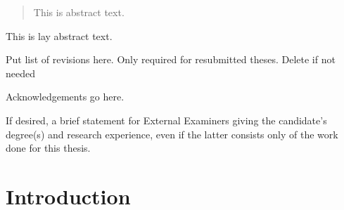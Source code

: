 \begin{abstract} %
  This is abstract text. 
  
  \lipsum[1-2]
\end{abstract}%
\clearpage



\begin{uomlay} %
  This is lay abstract text. 
  
  \lipsum[1-2]
\end{uomlay}



\uomdeclarations %



\begin{uomlotr} %
Put list of revisions here. Only required for resubmitted theses. Delete if not needed
\end{uomlotr} 



\begin{uomacknowledgements} %
Acknowledgements go here.
\end{uomacknowledgements}



\begin{uomauthor} %
If desired, a brief statement for External Examiners giving the candidate’s degree(s) and research experience, even if the latter consists only of the work done for this thesis.
\end{uomauthor} 



\chapter{Introduction} %
  
  \lipsum[1-5] %

